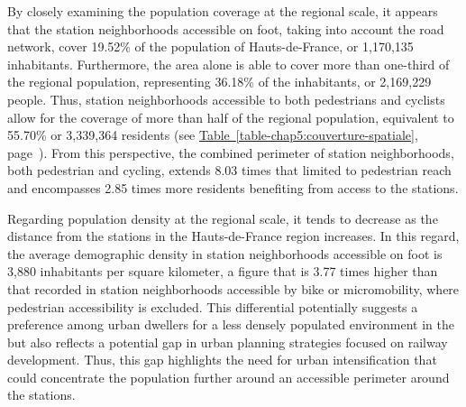 \begin{refsegment}
By closely examining the population coverage at the regional scale, it appears that the station neighborhoods accessible on foot, taking into account the road network, cover 19.52\% of the population of Hauts-de-France, or 1,170,135 inhabitants. Furthermore, the  area alone is able to cover more than one-third of the regional population, representing 36.18\% of the inhabitants, or 2,169,229 people. Thus, station neighborhoods accessible to both pedestrians and cyclists allow for the coverage of more than half of the regional population, equivalent to 55.70\% or 3,339,364 residents (see \hyperref[table-chap5:couverture-spatiale]{Table~\ref{table-chap5:couverture-spatiale}}, page~\pageref{table-chap5:couverture-spatiale}). From this perspective, the combined perimeter of station neighborhoods, both pedestrian and cycling, extends 8.03 times that limited to pedestrian reach and encompasses 2.85 times more residents benefiting from access to the stations.%


Regarding population density at the regional scale, it tends to decrease as the distance from the stations in the Hauts-de-France region increases. In this regard, the average demographic density in station neighborhoods accessible on foot is 3,880 inhabitants per square kilometer, a figure that is 3.77 times higher than that recorded in station neighborhoods accessible by bike or micromobility, where pedestrian accessibility is excluded. This differential potentially suggests a preference among urban dwellers for a less densely populated environment in the  but also reflects a potential gap in urban planning strategies focused on railway development. Thus, this gap highlights the need for urban intensification that could concentrate the population further around an accessible perimeter around the stations.%


\end{refsegment}
